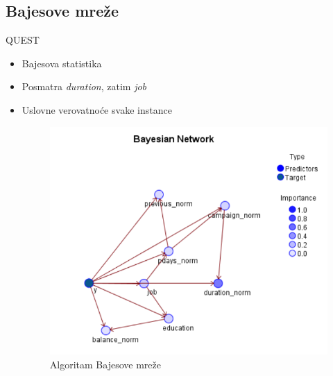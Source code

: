 \documentclass{beamer}
\begin{document}
\subsection{Bajesove mreže}

\begin{frame}{QUEST}
    \begin{itemize}
        \item Bajesova statistika
        \item Posmatra \textit{duration}, zatim \textit{job}
        \item Uslovne verovatnoće svake instance
        \begin{figure}[h!]
                \begin{center}
                \includegraphics[scale=0.40]{Bajes_mreza.png}
                \end{center}
                \caption{Algoritam Bajesove mreže}
     	\end{figure}
    \end{itemize}
\end{frame}
\end{document}
